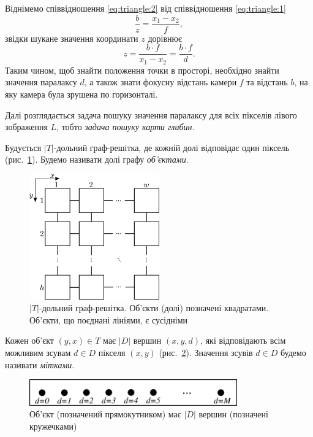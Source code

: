 Віднімемо співвідношення \eqref{eq:triangle:2} від співвідношення
\eqref{eq:triangle:1}
\begin{equation*}
    \frac{b}{z} = \frac{x_1 - x_2}{f},
\end{equation*}
звідки шукане значення координати $z$ дорівнює
\begin{equation*}
    z = \frac{b \cdot f}{x_1 - x_2} = \frac{b \cdot f}{d}.
\end{equation*}
Таким чином, щоб знайти положення точки в просторі,
необхідно знайти значення паралаксу $d$,
а також знати фокусну відстань камери $f$ та відстань  $b$,
на яку камера була зрушена по горизонталі.

Далі розглядається задача пошуку значення паралаксу для всіх пікселів
лівого зображення $L$, тобто \textit{задача пошуку карти глибин}.

Будується $\left| T \right|$-дольний граф-решітка,
де кожній долі відповідає один піксель (рис.~\ref{fig:grid:graph:pixels}).
Будемо називати долі графу \textit{об'єктами}.

\begin{figure}[h]
  \centering
  \includegraphics[width=0.5\textwidth]{images/grid_graph_pixels}
  \caption{$\left|T \right|$-дольний граф-решітка.
           Об'єкти (долі) позначені квадратами.
           Об'єкти, що поєднані лініями, є сусідніми}
  \label{fig:grid:graph:pixels}
\end{figure}


Кожен об'єкт $\left(y, x \right) \in T$ має $\left| D \right| $ вершин
$ \left( x, y, d \right)$,
які відповідають всім можливим зсувам $d \in D$ пікселя $\left(x, y \right)$
(рис.~\ref{fig:object:vertices}).
Значення зсувів $d \in D$ будемо називати \textit{мітками}.

\begin{figure}[h]
  \centering
  \includegraphics[width=0.8\textwidth]{images/object_with_vertices}
  \caption{Об'єкт (позначений прямокутником) має $\left| D \right|$ вершин
           (позначені кружечками)}
  \label{fig:object:vertices}
\end{figure}

